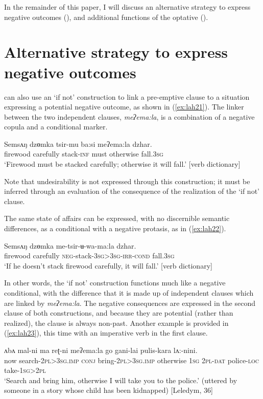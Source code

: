 \documentclass[output=paper,colorlinks,citecolor=brown]{langscibook}
\begin{document}
In the remainder of this paper, I will discuss an alternative strategy to express negative outcomes (), and additional functions of the optative ().




\section{Alternative strategy to express negative outcomes}
\label{sec:altstrategy}


 can also use an `if not' construction to link a pre-emptive clause to a situation expressing a potential negative outcome, as shown in (\ref{ex:lah21}). The linker between the two independent clauses, \textit{meʔema:la}, is a combination of a negative copula and a conditional marker.

\ea \label{ex:lah21}
\gll Semsʌŋ dzɵmka tsir-mu ba:si meʔema:la dzhar. \\
firewood carefully stack-\textsc{inf} must otherwise fall.\textsc{3sg} \\
\glt `Firewood must be stacked carefully; otherwise it will fall.' [verb dictionary]
\z

\noindent Note that undesirability is not expressed through this construction; it must be inferred through an evaluation of the consequence of the realization of the `if not' clause.

The same state of affairs can be expressed, with no discernible semantic differences, as a conditional with a negative protasis, as in (\ref{ex:lah22}).


\ea \label{ex:lah22}
\gll Semsʌŋ dzɵmka me-tsir-ʉ{}-wa-ma:la dzhar. \\
firewood carefully \textsc{neg-}stack-\textsc{3sg>3sg}-\textsc{irr-cond} fall\textsc{.3sg} \\
\glt `If he doesn't stack firewood carefully, it will fall.' [verb dictionary]
\z

In other words, the `if not' construction functions much like a negative conditional, with the difference that it is made up of independent clauses which are linked by \textit{meʔema:la}. The negative consequences are expressed in the second clause of both constructions, and because they are potential (rather than realized), the clause is always non-past. Another example is provided in (\ref{ex:lah23}), this time with an imperative verb in the first clause.

\ea \label{ex:lah23}
\gll ʌbʌ mal-ni ma reʈ-ni meʔema:la go gani-lai pulis-kara lʌ:-nini. \\
now search\textsc{-2pl>3sg.imp} \textsc{conj} bring-\textsc{2pl>3sg.imp} otherwise \textsc{1sg} \textsc{2pl-dat} police-\textsc{loc} take-\textsc{1sg>2pl} \\
\glt `Search and bring him, otherwise I will take you to the police.' (uttered by someone in a story whose child has been kidnapped) [Leledym, 36]
\z
\end{document}
